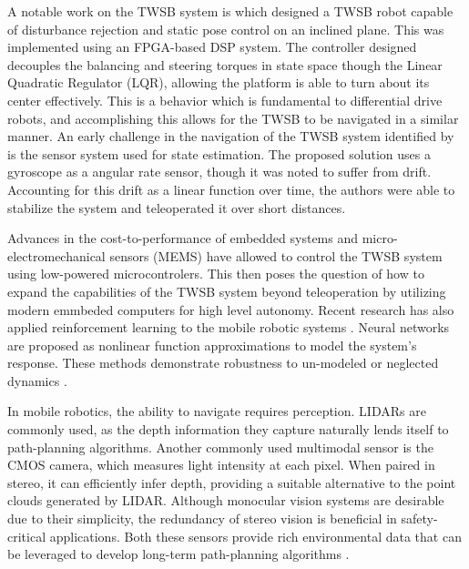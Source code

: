     A notable work on the TWSB system is \cite{grasser2002joe} which designed a TWSB robot capable of disturbance
    rejection and static pose control on an inclined plane. This was implemented using an FPGA-based DSP system.
    The controller designed decouples the balancing and steering torques in state space though the Linear Quadratic Regulator (LQR), 
    allowing the platform is able to turn about its center effectively. This is a behavior which is fundamental to differential drive robots, 
    and accomplishing this allows for the TWSB to be navigated in a similar manner.
    An early challenge in the navigation of the TWSB system identified by \cite{SelfContainedMobileTWSB} is the sensor 
    system used for state estimation. The proposed solution uses a gyroscope as a angular rate sensor, though it 
    was noted to suffer from drift. Accounting for this drift as a linear function over time, the authors were able to 
    stabilize the system and teleoperated it over short distances. 

    Advances in the cost-to-performance of embedded systems and micro-electromechanical sensors (MEMS) \cite{MEMS} 
    have allowed \cite{juang2013design} \cite{Velazquez2016VelocityAM} to control the TWSB system 
    using low-powered microcontrolers. This then poses the question of how to expand the capabilities 
    of the TWSB system beyond teleoperation by utilizing modern emmbeded computers for high level autonomy. 
    Recent research has also applied reinforcement learning to the mobile robotic systems \cite{kober2013reinforcement}.
    Neural networks are proposed as nonlinear function approximations to model the system's response. 
    These methods demonstrate robustness to un-modeled or neglected dynamics \cite{guo2021optimal}.

    In mobile robotics, the ability to navigate requires perception. LIDARs are commonly used, as  
    the depth information they capture naturally lends itself to path-planning algorithms.
    Another commonly used multimodal sensor is the CMOS camera, which measures light intensity at each pixel. 
    When paired in stereo, it can efficiently infer depth, providing a suitable alternative to the point 
    clouds generated by LIDAR. Although monocular vision systems are desirable due to their simplicity, 
    the redundancy of stereo vision is beneficial in safety-critical applications.
    Both these sensors provide rich environmental data that can be leveraged to develop long-term path-planning algorithms \cite{gonzalez2015review}.
    
